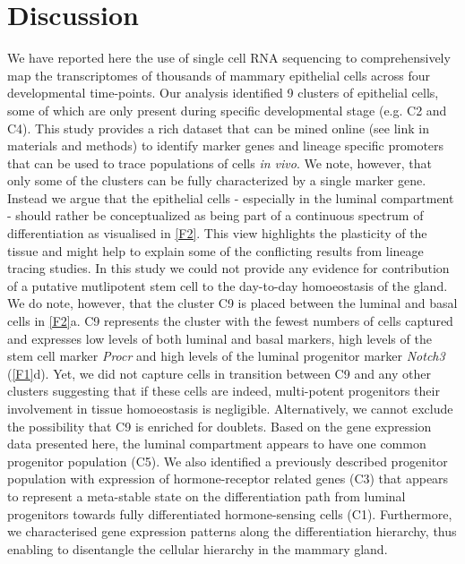 \documentclass[titlepage, 12pt, oneside]{amsart}
\begin{document}
\section{Discussion}

We have reported here the use of single cell RNA sequencing to comprehensively map the transcriptomes of thousands of mammary epithelial cells across four developmental time-points.
Our analysis identified 9 clusters of epithelial cells, some of which are only present during specific developmental stage (e.g. C2 and C4).
This study provides a rich dataset that can be mined online (see link in materials and methods) to identify marker genes and lineage specific promoters that can be used to trace populations of cells \textit{in vivo}.
We note, however, that only some of the clusters can be fully characterized by a single marker gene.
Instead we argue that the epithelial cells - especially in the luminal compartment - should rather be conceptualized as being part of a continuous spectrum of differentiation as visualised in \autoref{F2}.
This view highlights the plasticity of the tissue and might help to explain some of the conflicting results from lineage tracing studies\autocite{Inman2015}.
In this study we could not provide any evidence for contribution of a putative mutlipotent stem cell to the day-to-day homoeostasis of the gland.
We do note, however, that the cluster C9 is placed between the luminal and basal cells in \autoref{F2}a.
C9 represents the cluster with the fewest numbers of cells captured and expresses low levels of both luminal and basal markers, high levels of the stem cell marker \textit{Procr}\autocite{Wang2015} and high levels of the luminal progenitor marker \textit{Notch3}\autocite{Lafkas2013} (\autoref{F1}d).
Yet, we did not capture cells in transition between C9 and any other clusters suggesting that if these cells are indeed, multi-potent progenitors their involvement in tissue homoeostasis is negligible.
Alternatively, we cannot exclude the possibility that C9 is enriched for doublets.
Based on the gene expression data presented here, the luminal compartment appears to have one common progenitor population (C5).
We also identified a previously described progenitor population with expression of hormone-receptor related genes (C3) that appears to represent a meta-stable state on the differentiation path from luminal progenitors towards fully differentiated hormone-sensing cells (C1).
Furthermore, we characterised gene expression patterns along the differentiation hierarchy, thus enabling to disentangle the cellular hierarchy in the mammary gland.
\end{document}
